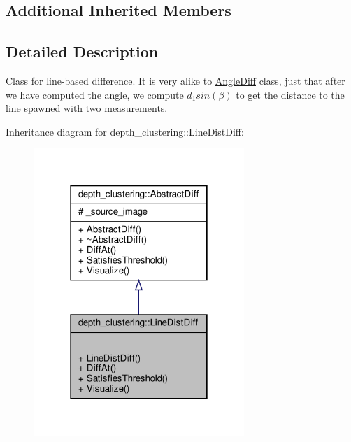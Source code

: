 \subsection*{Additional Inherited Members}


\subsection{Detailed Description}
Class for line-\/based difference. It is very alike to \hyperlink{classdepth__clustering_1_1AngleDiff}{Angle\+Diff} class, just that after we have computed the angle, we compute $d_1 sin(\beta)$ to get the distance to the line spawned with two measurements. 

Inheritance diagram for depth\+\_\+clustering\+:\+:Line\+Dist\+Diff\+:\nopagebreak
\begin{figure}[H]
\begin{center}
\leavevmode
\includegraphics[width=226pt]{classdepth__clustering_1_1LineDistDiff__inherit__graph}
\end{center}
\end{figure}


